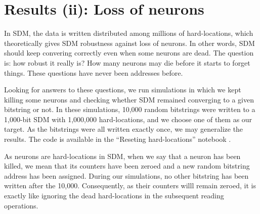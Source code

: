 


\chapter{Results (ii): Loss of neurons}

In SDM, the data is written distributed among millions of hard-locations, which theoretically gives SDM robustness against loss of neurons. In other words, SDM should keep convering correctly even when some neurons are dead. The question is: how robust it really is? How many neurons may die before it starts to forget things. These questions have never been addresses before.

Looking for answers to these questions, we run simulations in which we kept killing some neurons and checking whether SDM remained converging to a given bitstring or not. In these simulations, 10,000 random bitstrings were written to a 1,000-bit SDM with 1,000,000 hard-locations, and we choose one of them as our target. As the bitstrings were all written exactly once, we may generalize the results. The code is available in the ``Reseting hard-locations'' notebook \citep{sdmframework}.

As neurons are hard-locations in SDM, when we say that a neuron has been killed, we mean that its counters have been zeroed and a new random bitstring address has been assigned. During our simulations, no other bitstring has been written after the 10,000. Consequently, as their counters willl remain zeroed, it is exactly like ignoring the dead hard-locations in the subsequent reading operations.

